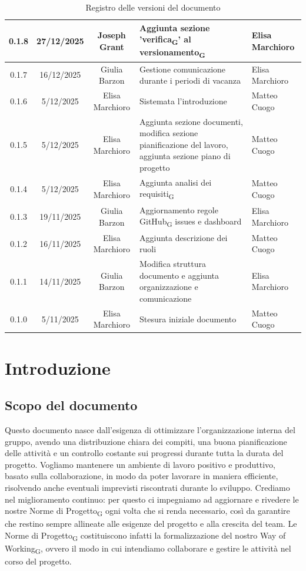 \documentclass[11pt,a4paper]{article}
\newcommand{\gls}[1]{#1\textsubscript{G}}
\begin{document}
\begin{table}[H]
\begin{tabular}{|c|c|c|>{\raggedright\arraybackslash}p{}|p{}|}
        \hline
        0.1.8 & 27/12/2025 & Joseph Grant & Aggiunta sezione '\gls{verifica}' al \gls{versionamento} & Elisa Marchioro\\ 
        \hline
        0.1.7 & 16/12/2025 & Giulia Barzon & Gestione comunicazione durante i periodi di vacanza & Elisa Marchioro\\
        \hline
        0.1.6 & 5/12/2025 & Elisa Marchioro & Sistemata l'introduzione & Matteo Cuogo\\
        \hline
        0.1.5 & 5/12/2025 & Elisa Marchioro & Aggiunta sezione documenti, modifica sezione pianificazione del lavoro, aggiunta sezione piano di progetto & Matteo Cuogo\\
        \hline
        0.1.4 & 5/12/2025 & Elisa Marchioro & Aggiunta \gls{analisi dei requisiti} & Matteo Cuogo\\
        \hline
        0.1.3 & 19/11/2025 & Giulia Barzon & Aggiornamento regole \gls{GitHub} issues e dashboard & Elisa Marchioro\\
        \hline
        0.1.2 & 16/11/2025 & Elisa Marchioro & Aggiunta descrizione dei ruoli & Matteo Cuogo\\
        \hline
        0.1.1 & 14/11/2025 & Giulia Barzon & Modifica struttura documento e aggiunta organizzazione e comunicazione & Elisa Marchioro\\
        \hline
        0.1.0 & 5/11/2025 & Elisa Marchioro & Stesura iniziale documento & Matteo Cuogo \\
        \hline
    \end{tabular}
    \caption{Registro delle versioni del documento}
    \label{tab:versionamento}
\end{table}

\newpage

\tableofcontents
\newpage

\section{Introduzione}
\subsection{Scopo del documento}
Questo documento nasce dall’esigenza di ottimizzare l’organizzazione interna del gruppo, avendo una distribuzione chiara dei compiti, una buona pianificazione delle attività e un controllo costante sui progressi durante tutta la durata del progetto. Vogliamo mantenere un ambiente di
lavoro positivo e produttivo, basato sulla collaborazione, in modo da poter lavorare in maniera efficiente, risolvendo anche eventuali imprevisti riscontrati durante lo sviluppo.
Crediamo nel miglioramento continuo: per questo ci impegniamo ad aggiornare e rivedere le nostre \gls{Norme di Progetto} ogni volta che si renda necessario, così da garantire che restino sempre allineate alle esigenze del progetto e alla crescita del team. Le \gls{Norme di Progetto} costituiscono infatti la formalizzazione del nostro \gls{Way of Working}, ovvero il modo in cui intendiamo collaborare e gestire le attività nel corso del progetto.
\end{document}
